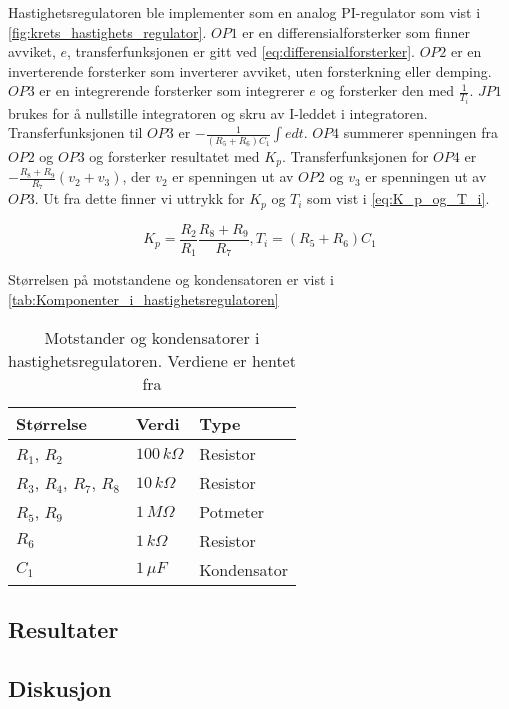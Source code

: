 Hastighetsregulatoren ble implementer som en analog PI-regulator som vist i \autoref{fig:krets_hastighets_regulator}. $OP1$ er en differensialforsterker som finner avviket, $e$, transferfunksjonen er gitt ved \autoref{eq:differensialforsterker}.
$OP2$ er en inverterende forsterker som inverterer avviket, uten forsterkning eller demping.
$OP3$ er en integrerende forsterker som integrerer $e$ og forsterker den med $\frac{1}{T_i}$. $JP1$ brukes for å nullstille integratoren og skru av I-leddet i integratoren. Transferfunksjonen til $OP3$ er $-\frac{1}{(R_5 + R_6) C_1} \int e dt$.
$OP4$ summerer spenningen fra $OP2$ og $OP3$ og forsterker resultatet med $K_p$. Transferfunksjonen for $OP4$ er $-\frac{R_8 + R_9}{R_7}(v_2 + v_3)$, der $v_2$ er spenningen ut av $OP2$ og $v_3$ er spenningen ut av $OP3$. Ut fra dette finner vi uttrykk for $K_p$ og $T_i$ som vist i \autoref{eq:K_p_og_T_i}.

\begin{equation}
    \label{eq:K_p_og_T_i}
    K_p = \frac{R_2}{R_1} \frac{R_8 + R_9}{R_7},
    T_i = (R_5 + R_6) C_1
\end{equation}

Størrelsen på motstandene og kondensatoren er vist i \autoref{tab:Komponenter_i_hastighetsregulatoren}

\begin{table}
    \centering
    \caption{Motstander og kondensatorer i hastighetsregulatoren. Verdiene er hentet fra \cite{AnalogMotorlabbOppgaver}}
    \begin{tabular}{lll}
        \toprule
        Størrelse & Verdi & Type \\
		\midrule
        $R_1$, $R_2$ & $100\,k\Omega$ & Resistor\\
        $R_3$, $R_4$, $R_7$, $R_8$ & $10\,k\Omega$ & Resistor \\
        $R_5$, $R_9$ & $1\,M\Omega$ & Potmeter \\
        $R_6$ & $1\,k\Omega$ & Resistor \\
        $C_1$ & $1\,\mu F$ & Kondensator \\
        \bottomrule
    \end{tabular}
    \label{tab:Komponenter_i_hastighetsregulatoren}
\end{table}

\subsection{Resultater}

\subsection{Diskusjon}
